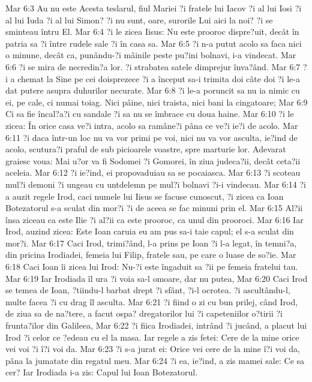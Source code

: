Mar 6:3  Au nu este Acesta teslarul, fiul Mariei ?i fratele lui Iacov ?i al lui Iosi ?i al lui Iuda ?i al lui Simon? ?i nu sunt, oare, surorile Lui aici la noi? ?i se sminteau întru El.
Mar 6:4  ?i le zicea Iisus: Nu este prooroc dispre?uit, decât în patria sa ?i între rudele sale ?i în casa sa.
Mar 6:5  ?i n-a putut acolo sa faca nici o minune, decât ca, punându-?i mâinile peste pu?ini bolnavi, i-a vindecat.
Mar 6:6  ?i se mira de necredin?a lor. ?i strabatea satele dimprejur înva?ând.
Mar 6:7  ?i a chemat la Sine pe cei doisprezece ?i a început sa-i trimita doi câte doi ?i le-a dat putere asupra duhurilor necurate.
Mar 6:8  ?i le-a poruncit sa nu ia nimic cu ei, pe cale, ci numai toiag. Nici pâine, nici traista, nici bani la cingatoare;
Mar 6:9  Ci sa fie încal?a?i cu sandale ?i sa nu se îmbrace cu doua haine.
Mar 6:10  ?i le zicea: În orice casa ve?i intra, acolo sa ramâne?i pâna ce ve?i ie?i de acolo.
Mar 6:11  ?i daca într-un loc nu va vor primi pe voi, nici nu va vor asculta, ie?ind de acolo, scutura?i praful de sub picioarele voastre, spre marturie lor. Adevarat graiesc voua: Mai u?or va fi Sodomei ?i Gomorei, în ziua judeca?ii, decât ceta?ii aceleia.
Mar 6:12  ?i ie?ind, ei propovaduiau sa se pocaiasca.
Mar 6:13  ?i scoteau mul?i demoni ?i ungeau cu untdelemn pe mul?i bolnavi ?i-i vindecau.
Mar 6:14  ?i a auzit regele Irod, caci numele lui Iisus se facuse cunoscut, ?i zicea ca Ioan Botezatorul s-a sculat din mor?i ?i de aceea se fac minuni prin el.
Mar 6:15  Al?ii însa ziceau ca este Ilie ?i al?ii ca este prooroc, ca unul din prooroci.
Mar 6:16  Iar Irod, auzind zicea: Este Ioan caruia eu am pus sa-i taie capul; el s-a sculat din mor?i.
Mar 6:17  Caci Irod, trimi?ând, l-a prins pe Ioan ?i l-a legat, în temni?a, din pricina Irodiadei, femeia lui Filip, fratele sau, pe care o luase de so?ie.
Mar 6:18  Caci Ioan îi zicea lui Irod: Nu-?i este îngaduit sa ?ii pe femeia fratelui tau.
Mar 6:19  Iar Irodiada îl ura ?i voia sa-l omoare, dar nu putea,
Mar 6:20  Caci Irod se temea de Ioan, ?tiindu-l barbat drept ?i sfânt, ?i-l ocrotea. ?i ascultându-l, multe facea ?i cu drag îl asculta.
Mar 6:21  ?i fiind o zi cu bun prilej, când Irod, de ziua sa de na?tere, a facut ospa? dregatorilor lui ?i capeteniilor o?tirii ?i frunta?ilor din Galileea,
Mar 6:22  ?i fiica Irodiadei, intrând ?i jucând, a placut lui Irod ?i celor ce ?edeau cu el la masa. Iar regele a zis fetei: Cere de la mine orice vei voi ?i î?i voi da.
Mar 6:23  ?i s-a jurat ei: Orice vei cere de la mine î?i voi da, pâna la jumatate din regatul meu.
Mar 6:24  ?i ea, ie?ind, a zis mamei sale: Ce sa cer? Iar Irodiada i-a zis: Capul lui Ioan Botezatorul.

